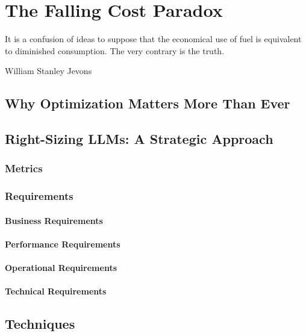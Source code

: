 \setchapterpreamble[u]{\margintoc}
\chapter{The Falling Cost Paradox}
\label{chapter:cost}

\epigraph{It is a confusion of ideas to suppose that the economical use of fuel is equivalent to diminished consumption. The very contrary is the truth.}{William Stanley Jevons}

\section{Why Optimization Matters More Than Ever}

\section{Right-Sizing LLMs: A Strategic Approach}

\subsection{Metrics}

\subsection{Requirements}

\subsubsection{Business Requirements}

\subsubsection{Performance Requirements}

\subsubsection{Operational Requirements}

\subsubsection{Technical Requirements}

\section{Techniques}

